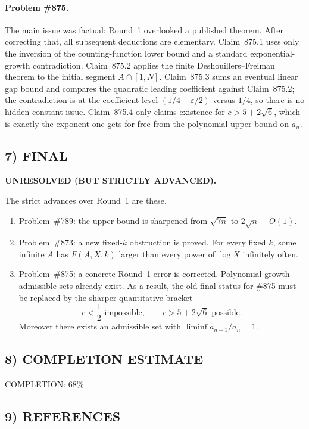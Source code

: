 \paragraph{Problem \#875.}
The main issue was factual: Round~1 overlooked a published theorem. After correcting that, all subsequent deductions are elementary. Claim~875.1 uses only the inversion of the counting-function lower bound and a standard exponential-growth contradiction. Claim~875.2 applies the finite Deshouillers--Freiman theorem to the initial segment \(A\cap[1,N]\). Claim~875.3 sums an eventual linear gap bound and compares the quadratic leading coefficient against Claim~875.2; the contradiction is at the coefficient level \((1/4-\varepsilon/2)\) versus \(1/4\), so there is no hidden constant issue. Claim~875.4 only claims existence for \(c>5+2\sqrt6\), which is exactly the exponent one gets for free from the polynomial upper bound on \(a_n\).

\subsection*{7) FINAL}

\textbf{UNRESOLVED (BUT STRICTLY ADVANCED).}

The strict advances over Round~1 are these.

\begin{enumerate}
\item Problem~\#789: the upper bound is sharpened from \(\sqrt{7n}\) to \(2\sqrt n+O(1)\).
\item Problem~\#873: a new fixed-\(k\) obstruction is proved. For every fixed \(k\), some infinite \(A\) has \(F(A,X,k)\) larger than every power of \(\log X\) infinitely often.
\item Problem~\#875: a concrete Round~1 error is corrected. Polynomial-growth admissible sets already exist. As a result, the old final status for \#875 must be replaced by the sharper quantitative bracket
\[
  c<\frac12 \text{ impossible},
  \qquad
  c>5+2\sqrt6 \text{ possible}.
\]
Moreover there exists an admissible set with \(\liminf a_{n+1}/a_n=1\).
\end{enumerate}

\subsection*{8) COMPLETION ESTIMATE}

COMPLETION: 68\%

\subsection*{9) REFERENCES}

